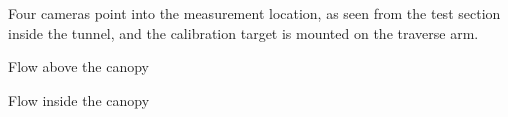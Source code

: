 \begin{frame}[label=iibr-2]
    \begin{multicols}{2}
    \centering
    \end{multicols}
    \begin{cardTiny}
    Four cameras point into the measurement location, as seen from the test section inside the tunnel, and the calibration target is mounted on the traverse arm.
    \end{cardTiny}
\end{frame}
    
\begin{frame}[label=iibr-1]
    \begin{multicols}{2}
    \centering{}
    \end{multicols}
\end{frame}
    
    
    
    
    
    
    
    \begin{frame}[label=app-12]{Flow above the canopy}
    \centering
    \end{frame}
    
    \begin{frame}[label=app-11]{Flow inside the canopy}
    \centering
    \end{frame}
    
